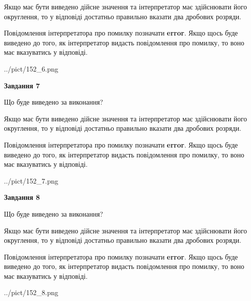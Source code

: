 \documentclass[12pt, ukrainian]{article}
\begin{document}
{\begin {Large}
Якщо має бути виведено дійсне значення та інтерпретатор має здійснювати його округлення, 
то у відповіді достатньо правильно вказати два дробових розряди.

Повідомлення інтерпретатора про помилку позначати \textbf{error}.
Якщо щось буде виведено до того, як інтерпретатор видасть повідомлення про помилку, 
то воно має вказуватись у відповіді. \par

\begin{center}
	{../pict/152_6.png}
\end{center}
\newpage

{\begin {center}\textbf{Завдання 7}\end {center}}\par
Що буде виведено за виконання? \par

Якщо має бути виведено дійсне значення та інтерпретатор має здійснювати його округлення, 
то у відповіді достатньо правильно вказати два дробових розряди.

Повідомлення інтерпретатора про помилку позначати \textbf{error}.
Якщо щось буде виведено до того, як інтерпретатор видасть повідомлення про помилку, 
то воно має вказуватись у відповіді. \par

\begin{center}
	{../pict/152_7.png}
\end{center}
\newpage

{\begin {center}\textbf{Завдання 8}\end {center}}\par
Що буде виведено за виконання? \par

Якщо має бути виведено дійсне значення та інтерпретатор має здійснювати його округлення, 
то у відповіді достатньо правильно вказати два дробових розряди.

Повідомлення інтерпретатора про помилку позначати \textbf{error}.
Якщо щось буде виведено до того, як інтерпретатор видасть повідомлення про помилку, 
то воно має вказуватись у відповіді. \par

\begin{center}
	{../pict/152_8.png}
\end{center}
\newpage


\end{Large}}
\end{document}
